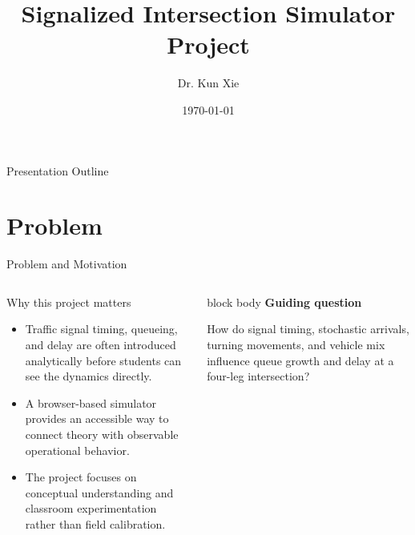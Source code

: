 \documentclass[aspectratio=169]{beamer}
\title{Signalized Intersection Simulator Project}
\author{Dr. Kun Xie}
\institute{Old Dominion University}
\date{\today}
\begin{document}
\begin{frame}
  \titlepage
\end{frame}

\begin{frame}{Presentation Outline}
  \tableofcontents
\end{frame}

\section{Problem}
\begin{frame}{Problem and Motivation}
  \begin{columns}[T,totalwidth=\textwidth]
    \begin{block}{Why this project matters}
      \begin{itemize}
        \item Traffic signal timing, queueing, and delay are often introduced analytically before students can see the dynamics directly.
        \item A browser-based simulator provides an accessible way to connect theory with observable operational behavior.
        \item The project focuses on conceptual understanding and classroom experimentation rather than field calibration.
      \end{itemize}
    \end{block}

    \begin{beamercolorbox}[rounded=true,shadow=false,sep=1em,wd=\textwidth]{block body}
      \textbf{Guiding question}

      \vspace{0.4em}
      How do signal timing, stochastic arrivals, turning movements, and vehicle mix influence queue growth and delay at a four-leg intersection?
    \end{beamercolorbox}
  \end{columns}
\end{frame}
\end{document}
